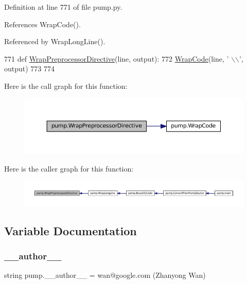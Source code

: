 Definition at line 771 of file pump.\+py.



References Wrap\+Code().



Referenced by Wrap\+Long\+Line().


\begin{DoxyCode}
771 \textcolor{keyword}{def }\hyperlink{namespacepump_a59e8ae06bae068d2d72df4f0340635d8}{WrapPreprocessorDirective}(line, output):
772   \hyperlink{namespacepump_a42502545a37fcd4513a0a7ac8ef3c0eb}{WrapCode}(line, \textcolor{stringliteral}{' \(\backslash\)\(\backslash\)'}, output)
773 
774 
\end{DoxyCode}
Here is the call graph for this function\+:
\nopagebreak
\begin{figure}[H]
\begin{center}
\leavevmode
\includegraphics[width=350pt]{namespacepump_a59e8ae06bae068d2d72df4f0340635d8_cgraph}
\end{center}
\end{figure}
Here is the caller graph for this function\+:
\nopagebreak
\begin{figure}[H]
\begin{center}
\leavevmode
\includegraphics[width=350pt]{namespacepump_a59e8ae06bae068d2d72df4f0340635d8_icgraph}
\end{center}
\end{figure}


\subsection{Variable Documentation}
\mbox{\label{namespacepump_ab99a065546038823261c774117df0798}} 
\subsubsection{\texorpdfstring{\+\_\+\+\_\+author\+\_\+\+\_\+}{\_\_author\_\_}}
{\footnotesize\ttfamily string pump.\+\_\+\+\_\+author\+\_\+\+\_\+ = \textquotesingle{}wan@google.\+com (Zhanyong Wan)\textquotesingle{}\hspace{0.3cm}{\ttfamily [private]}}



